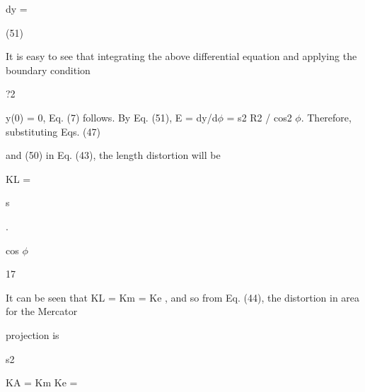\documentclass[a4paper,portrait,12pt]{article}
\begin{document}
\begin{flushleft}
dy =
\end{flushleft}





(51)





\begin{flushleft}
It is easy to see that integrating the above differential equation and applying the boundary condition
\end{flushleft}


?2


\begin{flushleft}
y(0) = 0, Eq. (7) follows. By Eq. (51), E = dy/d$\phi$ = s2 R2 / cos2 $\phi$. Therefore, substituting Eqs. (47)
\end{flushleft}


\begin{flushleft}
and (50) in Eq. (43), the length distortion will be
\end{flushleft}


\begin{flushleft}
KL =
\end{flushleft}





\begin{flushleft}
s
\end{flushleft}


.


\begin{flushleft}
cos $\phi$
\end{flushleft}





17





\begin{flushleft}
\newpage
It can be seen that KL = Km = Ke , and so from Eq. (44), the distortion in area for the Mercator
\end{flushleft}


\begin{flushleft}
projection is
\end{flushleft}


\begin{flushleft}
s2
\end{flushleft}


\begin{flushleft}
KA = Km Ke =
\end{flushleft}
\end{document}
